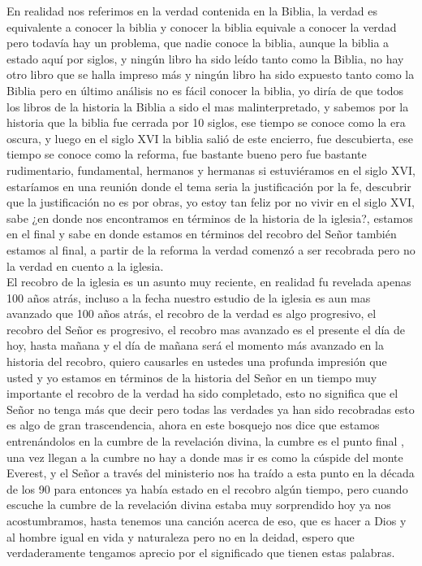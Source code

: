 \documentclass[12pt]{article}
\begin{document}
En realidad nos referimos en la verdad contenida en la Biblia, la verdad es equivalente a conocer la biblia y conocer la biblia equivale a conocer la verdad pero todavía hay un problema, que nadie conoce la biblia, aunque la biblia a estado aquí por siglos, y ningún libro ha sido leído tanto como la Biblia, no hay otro libro que se halla impreso más y ningún libro ha sido expuesto tanto como la Biblia pero en último análisis no es fácil conocer la biblia, yo diría de que todos los libros de la historia la Biblia a sido el mas malinterpretado, y sabemos por la historia que la biblia fue cerrada por 10 siglos, ese tiempo se conoce como la era oscura, y luego en el siglo XVI la biblia salió de este encierro, fue descubierta, ese tiempo se conoce como la reforma, fue bastante bueno pero fue bastante rudimentario, fundamental, hermanos y hermanas si estuviéramos en el siglo XVI, estaríamos en una reunión donde el tema seria la justificación por la fe, descubrir que la justificación no es por obras, yo estoy tan feliz por no vivir en el siglo XVI, sabe ¿en donde nos encontramos en términos de la historia de la iglesia?, estamos en el final y sabe en donde estamos en términos del recobro del Señor también estamos al final, a partir de la reforma la verdad comenzó a ser recobrada pero no la verdad en cuento a la iglesia.\\

El recobro de la iglesia es un asunto muy reciente, en realidad fu revelada apenas 100 años atrás, incluso a la fecha nuestro estudio de la iglesia es aun mas avanzado que 100 años atrás, el recobro de la verdad es algo progresivo, el recobro del Señor es progresivo, el recobro mas avanzado es el presente el día de hoy, hasta mañana y el día de mañana será el momento más avanzado en la historia del recobro, quiero causarles en ustedes una profunda impresión que usted y yo estamos en términos de la historia del Señor en un tiempo muy importante el recobro de la verdad ha sido completado, esto no significa que el Señor no tenga más que decir pero todas las verdades ya han sido recobradas esto es algo de gran trascendencia, ahora en este bosquejo nos dice que estamos entrenándolos en la cumbre de la revelación divina, la cumbre es el punto final , una vez llegan a la cumbre no hay a donde mas ir es como la cúspide del monte Everest, y el Señor a través del ministerio nos ha traído a esta punto en la década de los 90 para entonces ya había estado en el recobro algún tiempo, pero cuando escuche la cumbre de la revelación divina estaba muy sorprendido hoy ya nos acostumbramos, hasta tenemos una canción acerca de eso, que es hacer a Dios y al hombre igual en vida y naturaleza pero no en la deidad, espero que verdaderamente tengamos aprecio por el significado que tienen estas palabras.\\
\end{document}
